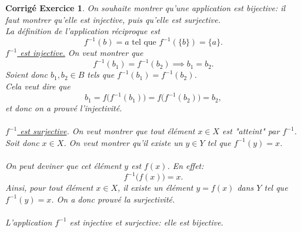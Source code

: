 \documentclass[11pt,french,table]{article}
\theoremstyle{exercice}
\theoremstyle{corrigé}
\newtheorem{corrigé}{Corrigé Exercice}
\begin{document}
\vspace{2em}
\begin{corrigé}
On souhaite montrer qu'une application est bijective: il faut montrer qu'elle est injective, puis qu'elle est surjective. \\
La définition de l'application réciproque est $$f^{-1}(b) = a \text{ tel que } f^{-1}(\{b\}) = \{a\}.$$
\underline{$f^{-1}$ est injective.} On veut montrer que $$f^{-1}(b_1) = f^{-1}(b_2) \implies b_1 = b_2.$$
Soient donc $b_1,b_2 \in B$ tels que $f^{-1}(b_1) = f^{-1}(b_2)$. \\
Cela veut dire que $$b_1 = f \Big( f^{-1}(b_1) \Big) = f \Big( f^{-1}(b_2) \Big) = b_2,$$
et donc on a prouvé l'injectivité.
\\
\\
\underline{$f^{-1}$ est surjective}. On veut montrer que tout élément $x \in X$ est "atteint" par $f^{-1}$. \\
Soit donc $x \in X$. On veut montrer qu'il existe un $y \in Y$ tel que $f^{-1}(y) = x$. \\ \\
On peut deviner que cet élément $y$ est $f(x)$. En effet:
$$f^{-1} \Big( f(x) \Big) = x.$$
Ainsi, pour tout élément $x \in X$, il existe un élément $y=f(x)$ dans $Y$ tel que $f^{-1}(y)=x$. On a donc prouvé la surjectivité. \\
\\
L'application $f^{-1}$ est injective et surjective: elle est bijective.
\end{corrigé}
\vspace{2em}
\end{document}
